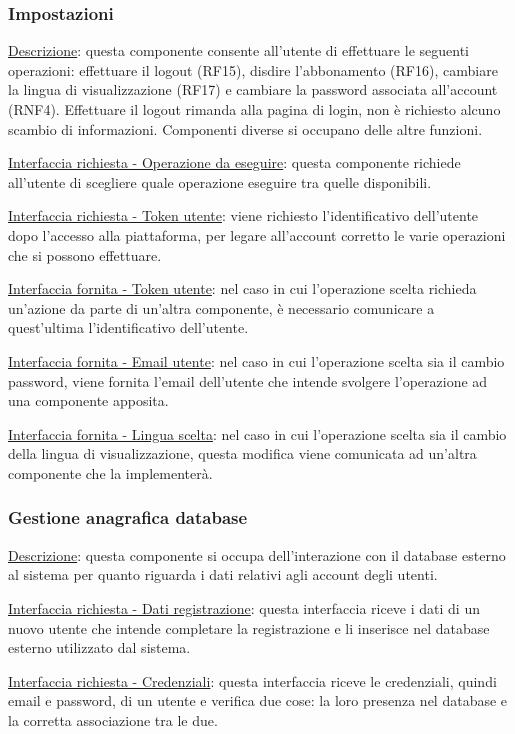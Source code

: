 \documentclass[a4paper,12pt]{article}
\begin{document}
\subsubsection{Impostazioni}

\underline{Descrizione}: questa componente consente all’utente di effettuare le seguenti operazioni: effettuare il logout (RF15), disdire l’abbonamento (RF16), cambiare la lingua di visualizzazione (RF17) e cambiare la password associata all’account (RNF4). Effettuare il logout rimanda alla pagina di login, non è richiesto alcuno scambio di informazioni. Componenti diverse si occupano delle altre funzioni.

\underline{Interfaccia richiesta - Operazione da eseguire}: questa componente richiede all’utente di scegliere quale operazione eseguire tra quelle disponibili.

\underline{Interfaccia richiesta - Token utente}: viene richiesto l’identificativo dell’utente dopo l’accesso alla piattaforma, per legare all’account corretto le varie operazioni che si possono effettuare.

\underline{Interfaccia fornita - Token utente}: nel caso in cui l’operazione scelta richieda un’azione da parte di un’altra componente, è necessario comunicare a quest’ultima l’identificativo dell’utente.

\underline{Interfaccia fornita - Email utente}: nel caso in cui l’operazione scelta sia il cambio password, viene fornita l’email dell’utente che intende svolgere l’operazione ad una componente apposita.

\underline{Interfaccia fornita - Lingua scelta}: nel caso in cui l’operazione scelta sia il cambio della lingua di visualizzazione, questa modifica viene comunicata ad un’altra componente che la implementerà.

\subsubsection{Gestione anagrafica database}

\underline{Descrizione}: questa componente si occupa dell’interazione con il database esterno al sistema per quanto riguarda i dati relativi agli account degli utenti.

\underline{Interfaccia richiesta - Dati registrazione}: questa interfaccia riceve i dati di un nuovo utente che intende completare la registrazione e li inserisce nel database esterno utilizzato dal sistema.

\underline{Interfaccia richiesta - Credenziali}: questa interfaccia riceve le credenziali, quindi email e password, di un utente e verifica due cose: la loro presenza nel database e la corretta associazione tra le due.
\end{document}
